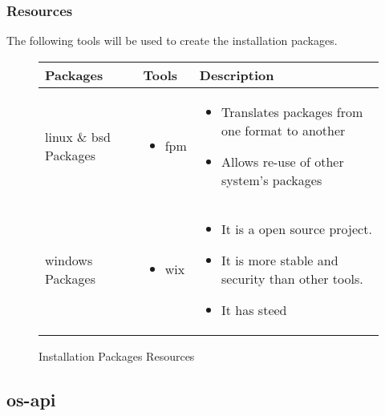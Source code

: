 \subsubsection{Resources}

The following tools will be used to create the installation packages. 
\begin{figure}
\begin{center}                                                                       
    \begin{tabular}{ | p{2.5cm} | p{5cm} | p{5cm} | }
    \hline
      Packages & Tools & Description\\ \hline
      \gls{linux} \& \gls{bsd} Packages  & 
      \begin{itemize}
      \item \gls{fpm}
      \end{itemize}
      & \begin{itemize}
      \item Translates packages from one format to another
      \item Allows re-use of other system's packages
      \end{itemize}
      \\ \hline
      \gls{windows} Packages & 
      \begin{itemize}
      \item \gls{wix}
      \end{itemize}
      & \begin{itemize}
      \item It is a open source project.
      \item It is more stable and security than other tools.
      \item It has steed
      \end{itemize}
      \\ \hline
    \end{tabular}
\end{center}
\caption{Installation Packages Resources}
\end{figure}
\subsection{\gls{os-api}}
\label{os-agnostic-api}

